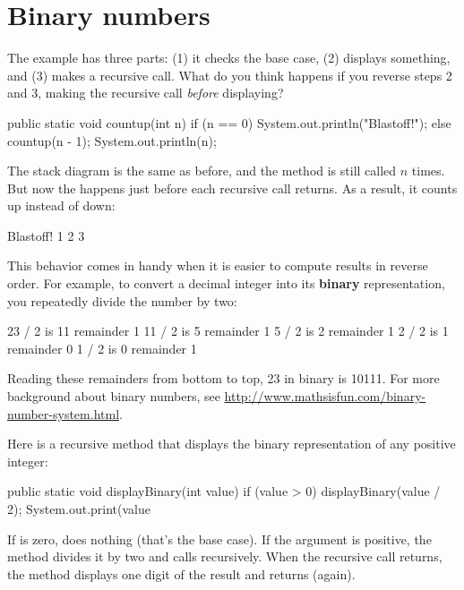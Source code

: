 \section{Binary numbers}

The  example has three parts: (1) it checks the base case, (2) displays something, and (3) makes a recursive call.
What do you think happens if you reverse steps 2 and 3, making the recursive call {\em before} displaying?

\begin{code}
public static void countup(int n) {
    if (n == 0) {
        System.out.println("Blastoff!");
    } else {
        countup(n - 1);
        System.out.println(n);
    }
}
\end{code}

The stack diagram is the same as before, and the method is still called $n$ times.
But now the  happens just before each recursive call returns.
As a result, it counts up instead of down:

\begin{stdout}
Blastoff!
1
2
3
\end{stdout}


This behavior comes in handy when it is easier to compute results in reverse order.
For example, to convert a decimal integer into its {\bf binary} representation, you repeatedly divide the number by two:

\begin{stdout}
23 / 2 is 11 remainder 1
11 / 2 is  5 remainder 1
 5 / 2 is  2 remainder 1
 2 / 2 is  1 remainder 0
 1 / 2 is  0 remainder 1
\end{stdout}

Reading these remainders from bottom to top, 23 in binary is 10111.
For more background about binary numbers, see \url{http://www.mathsisfun.com/binary-number-system.html}.

Here is a recursive method that displays the binary representation of any positive integer:

\begin{code}
public static void displayBinary(int value) {
    if (value > 0) {
        displayBinary(value / 2);
        System.out.print(value %
    }
}
\end{code}

If  is zero,  does nothing (that's the base case).
If the argument is positive, the method divides it by two and calls  recursively.
When the recursive call returns, the method displays one digit of the result and returns (again).

